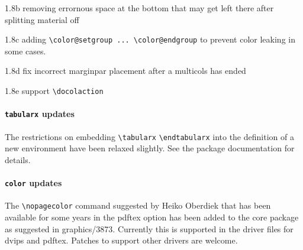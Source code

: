 \documentclass{ltnews}
\begin{document}
1.8b
removing errornous space at the bottom that may get left there after
splitting material off

1.8c
adding \verb|\color@setgroup ... \color@endgroup| to prevent color leaking in
some cases.

1.8d fix incorrect marginpar placement after a multicols has ended

1.8e support \verb=\docolaction=


\paragraph{\texttt{tabularx} updates}
The restrictions on embedding \verb|\tabularx| \verb|\endtabularx| into the definition of a new
environment have been relaxed slightly. See the package documentation for details.

\paragraph{\texttt{color} updates}
The \verb|\nopagecolor| command suggested by Heiko Oberdiek that has been available 
for some years in the \textsf{pdftex} option has been added to the core package as suggested in 
graphics/3873. Currently this is supported in the driver files for \textsf{dvips} and \textsf{pdftex}.
Patches to support other drivers are welcome.
\end{document}
